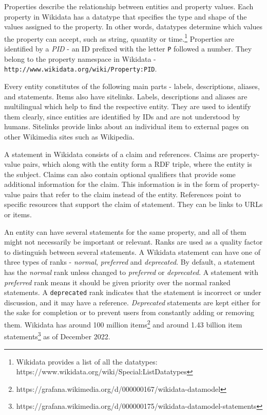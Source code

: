 Properties describe the relationship between entities and property values. Each property in Wikidata has a datatype that specifies the type and shape of the values assigned to the property. In other words, datatypes determine which values the property can accept, such as string, quantity or time.\footnote{Wikidata provides a list of all the datatypes: https://www.wikidata.org/wiki/Special:ListDatatypes} Properties are identified by a \textit{PID} - an ID prefixed with the letter \texttt{P} followed a number. They belong to the property namespace in Wikidata - \texttt{http://www.wikidata.org/wiki/Property:PID}. 

Every entity constitutes of the following main parts - labels, descriptions, aliases, and statements. Items also have sitelinks. Labels, descriptions and aliases are multilingual which help to find the respective entity. They are used to identify them clearly, since entities are identified by IDs and are not understood by humans. Sitelinks provide links about an individual item to external pages on other Wikimedia sites such as Wikipedia. 

A statement in Wikidata consists of a claim and references. Claims are property-value pairs, which along with the entity form a RDF triple, where the entity is the subject. Claims can also contain optional qualifiers that provide some additional information for the claim. This information is in the form of property-value pairs that refer to the claim instead of the entity. References point to specific resources that support the claim of statement. They can be links to URLs or items.

An entity can have several statements for the same property, and all of them might not necessarily be important or relevant. Ranks are used as a quality factor to distinguish between several statements. A Wikidata statement can have one of three types of ranks - \textit{normal}, \textit{preferred} and \textit{deprecated}. By default, a statement has the \textit{normal} rank unless changed to \textit{preferred} or \textit{deprecated}. A statement with \textit{preferred} rank means it should be given priority over the normal ranked statements. A \texttt{deprecated} rank indicates that the statement is incorrect or under discussion, and it may have a reference. \textit{Deprecated} statements are kept either for the sake for completion or to prevent users from constantly adding or removing them. Wikidata has around 100 million items\footnote{https://grafana.wikimedia.org/d/000000167/wikidata-datamodel} and around 1.43 billion item statements\footnote{https://grafana.wikimedia.org/d/000000175/wikidata-datamodel-statements} as of December 2022. 

